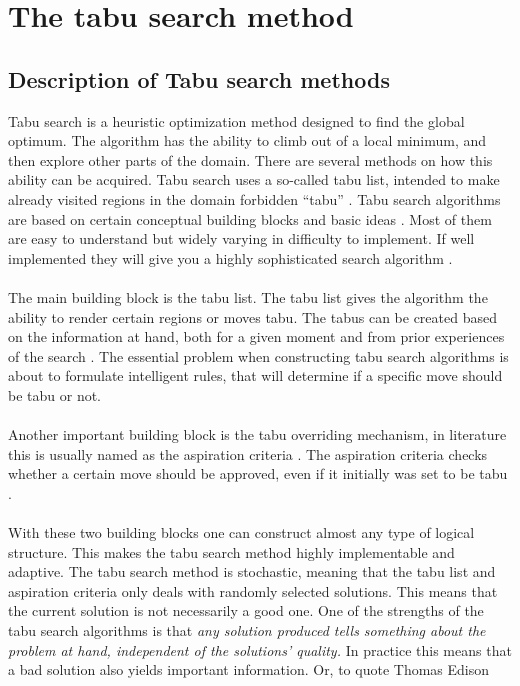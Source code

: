 \pagebreak
\section{The tabu search method}
\subsection{Description of Tabu search methods}
Tabu search is a heuristic optimization method designed to find the global optimum. The algorithm has the ability to climb out of a local minimum, and then explore other parts of the domain. There are several methods on how this ability can be acquired. Tabu search uses a so-called tabu list, intended to make already visited regions in the domain forbidden ``tabu'' . Tabu search algorithms are based on certain conceptual building blocks and basic ideas \cite{Glover1} \cite{Glover3} \cite{Glover4}. Most of them are easy to understand but widely varying in difficulty to implement. If well implemented they will give you a highly sophisticated search algorithm \cite{canada} \cite{Glover2}. \\
\\The main building block is the tabu list. The tabu list gives the algorithm the ability to render certain regions or moves tabu. The tabus can be created based on the information at hand, both for a given moment and from prior experiences of the search \cite{canada}. The essential problem when constructing tabu search algorithms is about to formulate intelligent rules, that will determine if a specific move should be tabu or not.\\
\\Another important building block is the tabu overriding mechanism, in literature this is usually named as the aspiration criteria . The aspiration criteria checks whether a certain move should be approved, even if it initially was set to be tabu \cite{canada} \cite{Glover2}. \\
\\With these two building blocks one can construct almost any type of logical structure. This makes the tabu search method highly implementable and adaptive. The tabu search method is stochastic, meaning that the tabu list and aspiration criteria only deals with randomly selected solutions. This means that the current solution is not necessarily a good one. One of the strengths of the tabu search algorithms is that \emph{any solution produced tells something about the problem at hand, independent of the solutions' quality.} In practice this means that a bad solution also yields important information.  Or, to quote Thomas Edison 
